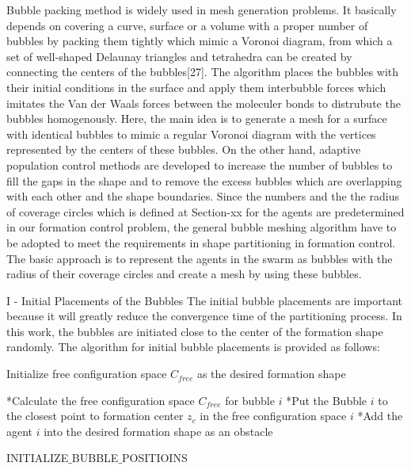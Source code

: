 \documentclass[twoside]{article}
\begin{document}
			Bubble packing method is widely used in mesh generation problems. It basically depends on covering a curve, surface or a volume with a proper number of bubbles by packing them tightly which mimic a Voronoi diagram, from which a set of well-shaped Delaunay triangles and tetrahedra can be created by connecting the centers of the bubbles[27].  The algorithm places the bubbles with their initial conditions in the surface and apply them interbubble forces which imitates the Van der Waals forces between the moleculer bonds  to distrubute the bubbles homogenously. Here, the main idea is to generate a mesh for a surface with identical bubbles to mimic a regular Voronoi diagram with the vertices represented by the centers of these bubbles. On the other hand, adaptive population control  methods are developed to increase the number of bubbles to fill the gaps in the shape and to remove the excess bubbles which are overlapping with each other and the shape boundaries. 
			 Since the numbers and the the radius of coverage circles which is defined at Section-xx for the agents are predetermined in our formation control problem, the general bubble meshing algorithm have to be adopted to meet the requirements in shape partitioning in formation control.  The basic approach is to represent the agents in the swarm as bubbles with the radius of  their coverage circles and create a mesh by using these bubbles. 
			
			I - Initial Placements of the Bubbles
		  The initial bubble placements are important because it will greatly reduce the convergence time of the partitioning process. In this work, the bubbles are initiated close to the center of the formation shape randomly. The algorithm for initial bubble placements is provided as follows:
		  

			
			
			\begin{algorithm}[H]
				
				Initialize free configuration space $C_{free}$ as the desired formation shape
				
				{		
					*Calculate the free configuration space $C_{free}$ for bubble $i$\;
					 *Put the Bubble $i$ to the closest point to  formation center  $z_c$  in the free configuration space $i$ \;
					 *Add the agent $i$ into the desired formation shape as an obstacle \;
				}
				
				
				\caption{INITIALIZE$\_$BUBBLE$\_$POSITIOINS}
			\end{algorithm}
		
\end{document}
